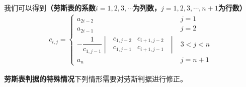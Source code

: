 我们可以得到\textbf{（劳斯表的系数$i = 1, 2, 3, \cdots$为列数，$j = 1, 2, 3, \cdots, n+1$为行数）}
\begin{align}
	c_{i,j} = 
	\begin{cases}
		a_{2i - 2} &j=1\\
		a_{2i - 1} & j =2\\
		-\dfrac{1}{c_{1,j-1}}
		\begin{vmatrix}
			\,\, c_{1,j-2} & c_{i+1,j-2} \,\,\\
			\,\, c_{1,j-1} & c_{i+1,j-1} \,\,
		\end{vmatrix} &3<j<n\\
	a_n & j = n+1
	\end{cases}
\end{align}
\vspace*{2em}

\noindent \textbf{劳斯表判据的特殊情况}\quad 下列情形需要对劳斯判据进行修正。
